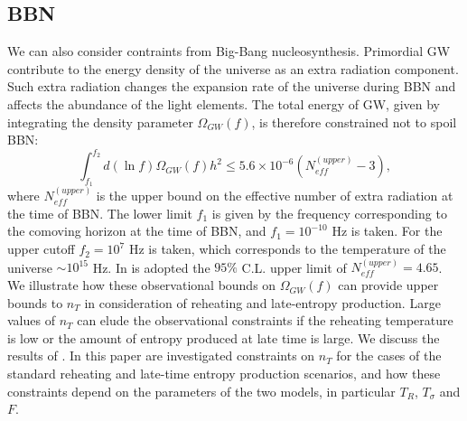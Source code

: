 \documentclass[11pt,a4paper,twoside]{book}
\begin{document}
\subsection*{BBN}
We can also consider contraints from Big-Bang nucleosynthesis. Primordial GW contribute to the energy density of the universe as an extra radiation component. Such extra radiation  changes the expansion rate of the universe during BBN and affects the abundance of the light elements. The total energy of GW, given by integrating the density  parameter  $ \Omega_{GW}(f) $, is therefore constrained not to spoil BBN:
\begin{equation}
	\label{Chap3:ConstraintsBBN}
	\int_{f_1}^{f_2} d(\ln f)\Omega_{GW}(f)h^{2} \le 5.6 \times 10^{-6}(N^{(upper)}_{eff} - 3),
\end{equation}
where $ N^{(upper)}_{eff} $ is the upper bound on the effective number of extra radiation at the time of BBN. The lower limit $ f_1 $ is given by the frequency  corresponding to the comoving horizon at the time of BBN, and $ f_{1}=10^{-10} $ Hz is taken. For the upper cutoff $ f_{2}=10^{7} $ Hz is taken, which corresponds to the temperature of the universe $ \sim 10^{15} $ Hz. In \cite{Chap3:BlueTiltedSpectrum} is adopted the $ 95 \% $ C.L. upper limit of $ N^{(upper)}_{eff} = 4.65 $.
\\

We illustrate how these observational bounds on $\Omega_{GW}(f)$ can provide upper bounds to $ n_{T} $ in consideration of  reheating and late-entropy production. Large values of $ n_{T} $ can elude the observational constraints if the reheating temperature is low or the amount of entropy produced at late time is large. We discuss the results of \cite{Chap3:BlueTiltedSpectrum}. In this paper are investigated constraints on $ n_{T} $ for the cases of the standard reheating and late-time entropy production scenarios, and how these constraints depend on the parameters of the two models, in particular $ T_{R} $, $ T_{\sigma} $ and $ F $.
\end{document}
